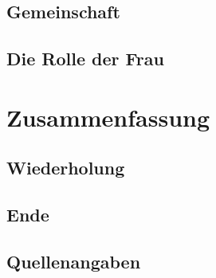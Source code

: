 \documentclass[12pt,a4paper,ngerman]{book}
\newcommand{\fchapter}[1]{\chapter{#1}\thispagestyle{chapterstyle}}
\begin{document}
\lipsum[6]

\section{Gemeinschaft}

\lipsum[6]

\section{Die Rolle der Frau}

\lipsum[6]

\fchapter{Zusammenfassung}

\section{Wiederholung}

\lipsum[6]

\section{Ende}

\lipsum[6]

\newpage %
\section{Quellenangaben}
\end{document}
